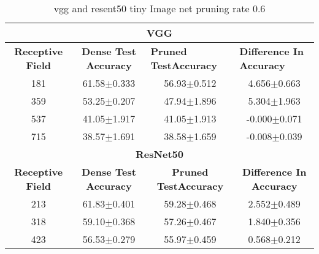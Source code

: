 \begin{table}[H]
\begin{tabular}{@{}cccc@{}}
\toprule
\multicolumn{4}{c}{\textbf{VGG}}                                                                                                                                  \\ \midrule
\textbf{Receptive Field} & \textbf{Dense Test Accuracy} & \multicolumn{1}{l}{\textbf{Pruned  TestAccuracy}} & \multicolumn{1}{l}{\textbf{Difference In Accuracy}} \\ \midrule
181                      & 61.58$\pm$0.333              & 56.93$\pm$0.512                                   & 4.656$\pm$0.663                                     \\
359                      & 53.25$\pm$0.207              & 47.94$\pm$1.896                                   & 5.304$\pm$1.963                                     \\
537                      & 41.05$\pm$1.917              & 41.05$\pm$1.913                                   & -0.000$\pm$0.071                                    \\
715                      & 38.57$\pm$1.691              & 38.58$\pm$1.659                                   & -0.008$\pm$0.039                                    \\ \midrule
\multicolumn{4}{c}{\textbf{ResNet50}}                                                                                                                             \\ \midrule
\textbf{Receptive Field} & \textbf{Dense Test Accuracy} & \textbf{Pruned  TestAccuracy}                     & \textbf{Difference In Accuracy}                     \\
213                      & 61.83$\pm$0.401              & 59.28$\pm$0.468                                   & 2.552$\pm$0.489                                     \\
318                      & 59.10$\pm$0.368              & 57.26$\pm$0.467                                   & 1.840$\pm$0.356                                     \\
423                      & 56.53$\pm$0.279              & 55.97$\pm$0.459                                   & 0.568$\pm$0.212                                     \\ \bottomrule
\end{tabular}
\caption{vgg and resent50 tiny Image net pruning rate 0.6}
\label{tab:tiny imagenet pruning rate06}
\end{table}




